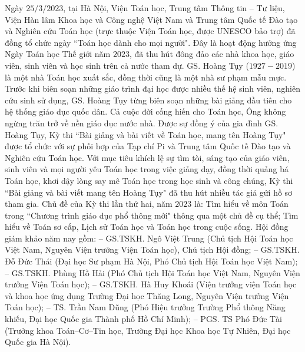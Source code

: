 \vspace*{230pt}


\begin{multicols}{2}	
	Ngày $25/3/2023$, tại Hà Nội, Viện Toán học, Trung tâm Thông tin -- Tư liệu, Viện Hàn lâm Khoa học và Công nghệ Việt Nam và Trung tâm Quốc tế Đào tạo và Nghiên cứu Toán học (trực thuộc Viện Toán học, được UNESCO bảo trợ) đã đồng tổ chức ngày ``Toán học dành cho mọi người". Đây là hoạt động hưởng ứng Ngày Toán học Thế giới năm $2023$, đã thu hút đông đảo các nhà khoa học, giáo viên, sinh viên và học sinh trên cả nước tham dự.
	\vskip 0.1cm
	GS. Hoàng Tụy ($1927 - 2019$) là một nhà Toán học xuất sắc, đồng thời cũng là một nhà sư phạm mẫu mực. Trước khi biên soạn những giáo trình đại học được nhiều thế hệ sinh viên, nghiên cứu sinh sử dụng, GS. Hoàng Tụy từng biên soạn những bài giảng đầu tiên cho hệ thống giáo dục quốc dân. Cả cuộc đời cống hiến cho Toán học, Ông không ngừng trăn trở về nền giáo dục nước nhà. Được sự đồng ý của gia đình GS. Hoàng Tụy, Kỳ thi ``Bài giảng và bài viết về Toán học, mang tên Hoàng Tụy" được tổ chức với sự phối hợp của Tạp chí Pi và Trung tâm Quốc tế Đào tạo và Nghiên cứu Toán học.
	\vskip 0.1cm
	Với mục tiêu khích lệ sự tìm tòi, sáng tạo của giáo viên, sinh viên và mọi người yêu Toán học trong việc giảng dạy, đồng thời quảng bá Toán học, khơi dậy lòng say mê Toán học trong học sinh và công chúng, Kỳ thi ``Bài giảng và bài viết mang tên Hoàng Tụy" đã thu hút nhiều tác giả gửi hồ sơ tham gia. 
	\vskip 0.1cm
	Chủ đề của Kỳ thi lần thứ hai, năm $2023$ là: Tìm hiểu về môn Toán trong 	``Chương trình giáo dục phổ thông mới" thông qua một chủ đề cụ thể; Tìm hiểu về Toán sơ cấp, Lịch sử Toán học và Toán học trong cuộc sống. Hội đồng giám khảo năm nay gồm: 
	\vskip 0.1cm
	--	GS.TSKH. Ngô Việt Trung (Chủ tịch Hội Toán học Việt Nam, Nguyên Viện trưởng Viện Toán học), Chủ tịch Hội đồng;
	\vskip 0.1cm 
	--	GS.TSKH. Đỗ Đức Thái (Đại học Sư phạm Hà Nội, Phó Chủ tịch Hội Toán học Việt Nam);
	\vskip 0.1cm
	--	GS.TSKH. Phùng Hồ Hải (Phó Chủ tịch Hội Toán học Việt Nam, Nguyên Viện trưởng Viện Toán học);
	\vskip 0.1cm
	--	GS.TSKH. Hà Huy Khoái (Viện trưởng viện Toán học và khoa học ứng dụng Trường Đại học Thăng Long, Nguyên Viện trưởng Viện Toán học);
	\vskip 0.1cm
	--	TS. Trần Nam Dũng (Phó Hiệu trưởng Trường Phổ thông Năng khiếu, Đại học Quốc gia Thành phố Hồ Chí Minh);
	\vskip 0.1cm
	--	PGS. TS Phó Đức Tài (Trưởng khoa Toán--Cơ--Tin học, Trường Đại học Khoa học Tự Nhiên, Đại học Quốc gia Hà Nội).
	\begin{figure}[H]
		\vspace*{-5pt}

\end{figure}
\end{multicols}
